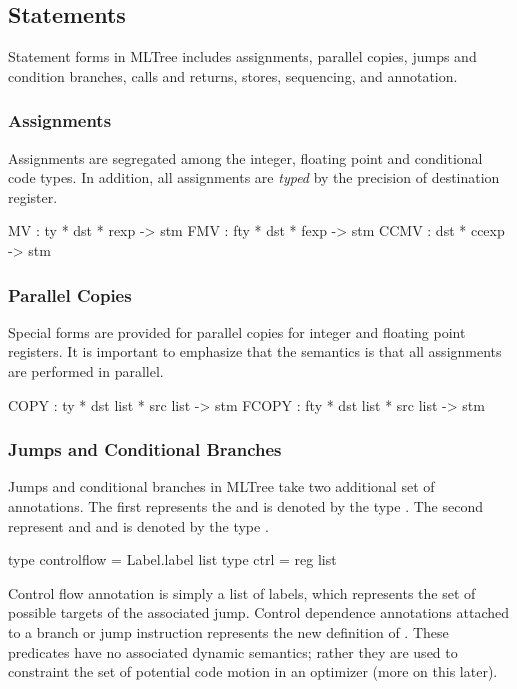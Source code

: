 \subsection{Statements}

Statement forms in MLTree includes assignments, parallel copies,
jumps and condition branches, calls and returns, stores, sequencing,
and annotation.

\subsubsection{Assignments}

Assignments are segregated among the integer, floating point and
conditional code types.  In addition, all assignments are \emph{typed}
by the precision of destination register.

\begin{SML}
   MV   : ty * dst * rexp -> stm
   FMV  : fty * dst * fexp -> stm
   CCMV : dst * ccexp -> stm
\end{SML}  

\subsubsection{Parallel Copies}

Special forms are provided for parallel copies for integer and
floating point registers.  It is important to emphasize that
the semantics is that all assignments are performed in parallel.

\begin{SML}
   COPY  : ty * dst list * src list -> stm
   FCOPY : fty * dst list * src list -> stm
\end{SML}

\subsubsection{Jumps and Conditional Branches}  

Jumps and conditional branches in MLTree take two additional set of
annotations.  The first represents the  and is denoted
by the type .  The second represent 
 and  
and is denoted by the type .

\begin{SML}
   type controlflow = Label.label list
   type ctrl = reg list
\end{SML}
Control flow annotation is simply a list of labels, which represents
the set of possible targets of the associated jump.  Control dependence
annotations attached to a branch or jump instruction represents the
new definition of .  These
predicates have no associated dynamic semantics; rather they are used
to constraint the set of potential code motion in an optimizer
(more on this later).

